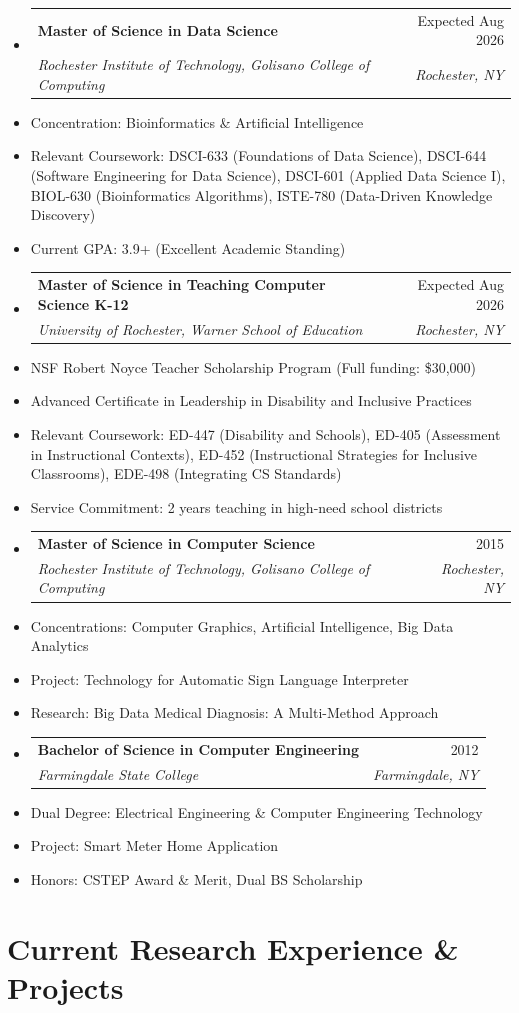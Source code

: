 \documentclass[10pt]{article}
\makeatletter
\newcommand{\resumeItem}[1]{\item\small{#1}}
\newcommand{\resumeSubheading}[4]{
  \vspace{-1pt}\item
    \begin{tabular*}{0.97\textwidth}[t]{l@{\extracolsep{\fill}}r}
      \textbf{#1} & #2 \\
      \textit{\small#3} & \textit{\small #4} \\
    \end{tabular*}\vspace{-5pt}
}
\makeatother
\begin{document}
\begin{itemize}[leftmargin=*]
\resumeSubheading
{Master of Science in Data Science}{Expected Aug 2026}
{Rochester Institute of Technology, Golisano College of Computing}{Rochester, NY}
\resumeItem{Concentration: Bioinformatics \& Artificial Intelligence}
\resumeItem{Relevant Coursework: DSCI-633 (Foundations of Data Science), DSCI-644 (Software Engineering for Data Science), DSCI-601 (Applied Data Science I), BIOL-630 (Bioinformatics Algorithms), ISTE-780 (Data-Driven Knowledge Discovery)}
\resumeItem{Current GPA: 3.9+ (Excellent Academic Standing)}

\resumeSubheading
{Master of Science in Teaching Computer Science K-12}{Expected Aug 2026}
{University of Rochester, Warner School of Education}{Rochester, NY}
\resumeItem{NSF Robert Noyce Teacher Scholarship Program (Full funding: \$30,000)}
\resumeItem{Advanced Certificate in Leadership in Disability and Inclusive Practices}
\resumeItem{Relevant Coursework: ED-447 (Disability and Schools), ED-405 (Assessment in Instructional Contexts), ED-452 (Instructional Strategies for Inclusive Classrooms), EDE-498 (Integrating CS Standards)}
\resumeItem{Service Commitment: 2 years teaching in high-need school districts}

\resumeSubheading
{Master of Science in Computer Science}{2015}
{Rochester Institute of Technology, Golisano College of Computing}{Rochester, NY}
\resumeItem{Concentrations: Computer Graphics, Artificial Intelligence, Big Data Analytics}
\resumeItem{Project: Technology for Automatic Sign Language Interpreter}
\resumeItem{Research: Big Data Medical Diagnosis: A Multi-Method Approach}

\resumeSubheading
{Bachelor of Science in Computer Engineering}{2012}
{Farmingdale State College}{Farmingdale, NY}
\resumeItem{Dual Degree: Electrical Engineering \& Computer Engineering Technology}
\resumeItem{Project: Smart Meter Home Application}
\resumeItem{Honors: CSTEP Award \& Merit, Dual BS Scholarship}
\end{itemize}


\section{Current Research Experience \& Projects}
\end{document}
